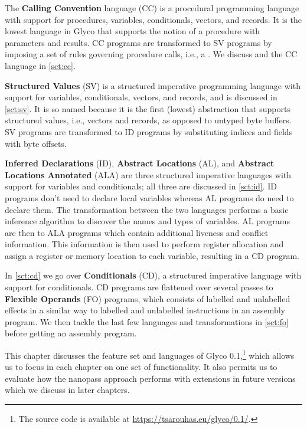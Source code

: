 \documentclass[main.tex]{subfiles}
\begin{document}
The \textbf{Calling Convention} language (CC) is a procedural programming language with support for procedures, variables, conditionals, vectors, and records. It is the lowest language in Glyco that supports the notion of a procedure with parameters and results. CC programs are transformed to SV programs by imposing a set of rules governing procedure calls, i.e., a . We discuss  and the CC language in \cref{sct:cc}.

\textbf{Structured Values} (SV) is a structured imperative programming language with support for variables, conditionals, vectors, and records, and is discussed in \cref{sct:sv}. It is so named because it is the first (lowest) abstraction that supports structured values, i.e., vectors and records, as opposed to untyped byte buffers. SV programs are transformed to ID programs by substituting indices and fields with byte offsets.

\textbf{Inferred Declarations} (ID), \textbf{Abstract Locations} (AL), and \textbf{Abstract Locations Annotated} (ALA) are three structured imperative languages with support for variables and conditionals; all three are discussed in \cref{sct:id}. ID programs don't need to declare local variables whereas AL programs do need to declare them. The transformation between the two languages performs a basic inference algorithm to discover the names and types of variables. AL programs are then \lowered{} to ALA programs which contain additional liveness and conflict information. This information is then used to perform register allocation and assign a register or memory location to each variable, resulting in a CD program.

In \cref{sct:cd} we go over \textbf{Conditionals} (CD), a structured imperative language with support for conditionals. CD programs are flattened over several passes to \textbf{Flexible Operands} (FO) programs, which consists of labelled and unlabelled effects in a similar way to labelled and unlabelled instructions in an assembly program. We then tackle the last few languages and transformations in \cref{sct:fo} before getting an assembly program.

This chapter discusses the feature set and languages of Glyco 0.1,\footnote{The source code is available at \url{https://tsarouhas.eu/glyco/0.1/}.} which allows us to focus in each chapter on one set of functionality. It also permits us to evaluate how the nanopass approach performs with extensions in future versions which we discuss in later chapters.
\end{document}
